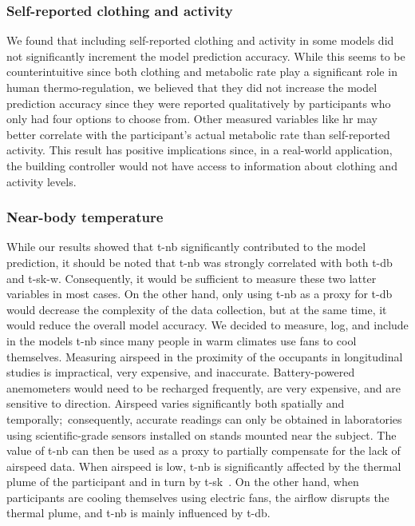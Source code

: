 \subsubsection{Self-reported clothing and activity}
We found that including self-reported clothing and activity in some models did not significantly increment the model prediction accuracy.
While this seems to be counterintuitive since both clothing and metabolic rate play a significant role in human thermo-regulation, we believed that they did not increase the model prediction accuracy since they were reported qualitatively by participants who only had four options to choose from.
Other measured variables like \ac{hr} may better correlate with the participant's actual metabolic rate than self-reported activity.
This result has positive implications since, in a real-world application, the building controller would not have access to information about clothing and activity levels.

\subsubsection{Near-body temperature}
While our results showed that \ac{t-nb} significantly contributed to the model prediction, it should be noted that \ac{t-nb} was strongly correlated with both \ac{t-db} and \ac{t-sk-w}.
Consequently, it would be sufficient to measure these two latter variables in most cases.
On the other hand, only using \ac{t-nb} as a proxy for \ac{t-db} would decrease the complexity of the data collection, but at the same time, it would reduce the overall model accuracy.
We decided to measure, log, and include in the models \ac{t-nb} since many people in warm climates use fans to cool themselves.
Measuring airspeed in the proximity of the occupants in longitudinal studies is impractical, very expensive, and inaccurate.
Battery-powered anemometers would need to be recharged frequently, are very expensive, and are sensitive to direction.
Airspeed varies significantly both spatially and temporally;\ consequently, accurate readings can only be obtained in laboratories using scientific-grade sensors installed on stands mounted near the subject.
The value of \acl{t-nb} can then be used as a proxy to partially compensate for the lack of airspeed data.
When airspeed is low, \ac{t-nb} is significantly affected by the thermal plume of the participant and in turn by \ac{t-sk}~\cite{Zhang2017}.
On the other hand, when participants are cooling themselves using electric fans, the airflow disrupts the thermal plume, and \ac{t-nb} is mainly influenced by \ac{t-db}.

